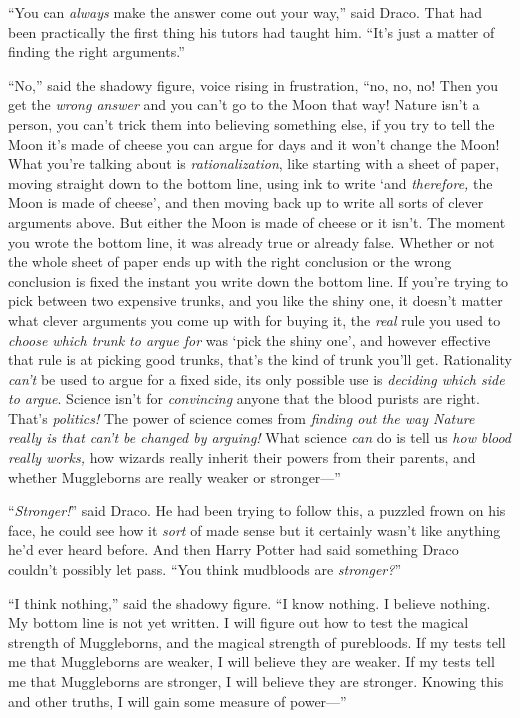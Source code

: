 “You can \emph{always} make the answer come out your way,” said Draco. That had been practically the first thing his tutors had taught him. “It’s just a matter of finding the right arguments.”

“No,” said the shadowy figure, voice rising in frustration, “no, no, no! Then you get the \emph{wrong answer} and you can’t go to the Moon that way! Nature isn’t a person, you can’t trick them into believing something else, if you try to tell the Moon it’s made of cheese you can argue for days and it won’t change the Moon! What you’re talking about is \emph{rationalization}, like starting with a sheet of paper, moving straight down to the bottom line, using ink to write ‘and \emph{therefore,} the Moon is made of cheese’, and then moving back up to write all sorts of clever arguments above. But either the Moon is made of cheese or it isn’t. The moment you wrote the bottom line, it was already true or already false. Whether or not the whole sheet of paper ends up with the right conclusion or the wrong conclusion is fixed the instant you write down the bottom line. If you’re trying to pick between two expensive trunks, and you like the shiny one, it doesn’t matter what clever arguments you come up with for buying it, the \emph{real} rule you used to \emph{choose which trunk to argue for} was ‘pick the shiny one’, and however effective that rule is at picking good trunks, that’s the kind of trunk you’ll get. Rationality \emph{can’t} be used to argue for a fixed side, its only possible use is \emph{deciding which side to argue}. Science isn’t for \emph{convincing} anyone that the blood purists are right. That’s \emph{politics!} The power of science comes from \emph{finding out the way Nature really is that can’t be changed by arguing!} What science \emph{can} do is tell us \emph{how blood really works,} how wizards really inherit their powers from their parents, and whether Muggleborns are really weaker or stronger—”

“\emph{Stronger!}” said Draco. He had been trying to follow this, a puzzled frown on his face, he could see how it \emph{sort} of made sense but it certainly wasn’t like anything he’d ever heard before. And then Harry Potter had said something Draco couldn’t possibly let pass. “You think mudbloods are \emph{stronger?}”

“I think nothing,” said the shadowy figure. “I know nothing. I believe nothing. My bottom line is not yet written. I will figure out how to test the magical strength of Muggleborns, and the magical strength of purebloods. If my tests tell me that Muggleborns are weaker, I will believe they are weaker. If my tests tell me that Muggleborns are stronger, I will believe they are stronger. Knowing this and other truths, I will gain some measure of power—”

